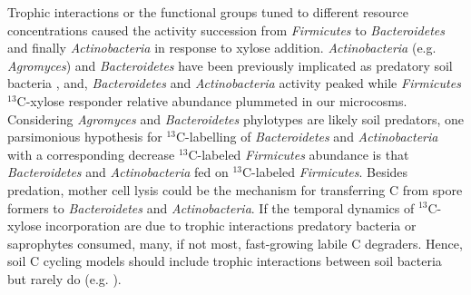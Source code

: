 Trophic interactions or the functional groups tuned to different resource
concentrations caused the activity succession from \textit{Firmicutes} to
\textit{Bacteroidetes} and finally \textit{Actinobacteria} in response to
xylose addition. \textit{Actinobacteria} (e.g. \textit{Agromyces}) and
\textit{Bacteroidetes} have been previously implicated as predatory soil
bacteria \citep{Lueders2006,16346402}, and, \textit{Bacteroidetes} and
\textit{Actinobacteria} activity peaked while \textit{Firmicutes}
$^{13}$C-xylose responder relative abundance plummeted in our microcosms.
Considering \textit{Agromyces} and \textit{Bacteroidetes} phylotypes are likely
soil predators, one parsimonious hypothesis for $^{13}$C-labelling of
\textit{Bacteroidetes} and \textit{Actinobacteria} with a corresponding
decrease $^{13}$C-labeled \textit{Firmicutes} abundance is that
\textit{Bacteroidetes} and \textit{Actinobacteria} fed on $^{13}$C-labeled
\textit{Firmicutes}. Besides predation, mother cell lysis could be the
mechanism for transferring C from spore formers to \textit{Bacteroidetes} and
\textit{Actinobacteria}. If the temporal dynamics of $^{13}$C-xylose
incorporation are due to trophic interactions predatory bacteria or saprophytes
consumed, many, if not most, fast-growing labile C degraders. Hence, soil
C cycling models should include trophic interactions between soil bacteria but
rarely do (e.g. \citep{Moore1988}).

